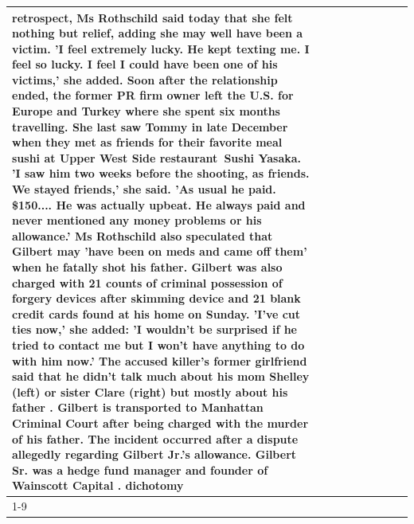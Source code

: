 \begin{table}[H]
\begin{tabular}{lllrlllll}
retrospect, Ms Rothschild said today that she felt nothing but relief, adding she may well have been a victim. 'I feel extremely lucky. He kept texting me. I feel so lucky. I feel I could have been one of his victims,' she added. Soon after the relationship ended, the former PR firm owner left the U.S. for Europe and Turkey where she spent six months  travelling. She last saw Tommy in late December when they met as friends for their favorite meal sushi at Upper West Side restaurant Sushi Yasaka. 'I saw him two weeks before the shooting, as friends. We stayed friends,' she said. 'As usual he paid. \$150.... He was actually upbeat. He always paid and never mentioned any money problems or his allowance.' Ms Rothschild also speculated that Gilbert may 'have been on meds and came off them' when he fatally shot his father. Gilbert was also charged with 21 counts of criminal possession of forgery devices after skimming device and 21 blank credit cards found at his home on Sunday. 'I've cut ties now,' she added: 'I wouldn’t be surprised if he tried to contact me but I won’t have anything to do with him now.' The accused killer's former girlfriend said that he didn't talk much about his mom Shelley (left) or sister Clare (right) but mostly about his father . Gilbert is transported to Manhattan Criminal Court  after being charged with the murder of his father. The incident occurred after a dispute allegedly regarding Gilbert Jr.'s allowance. Gilbert Sr. was a hedge fund manager and founder of Wainscott Capital . dichotomy \\
\cline{1-9} \cline{2-9}
\bottomrule
\end{tabular}
\end{table}
